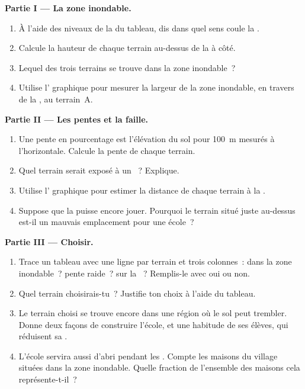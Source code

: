 \begin{problem}
\noindent\textbf{Partie I --- La zone inondable.}\par\nopagebreak
\begin{enumerate}[beginpenalty=10000]
  \item À l'aide des niveaux de la  du tableau, dis dans quel sens
        coule la .
  \item Calcule la hauteur de chaque terrain au-dessus de la  à
        côté.
  \item Lequel des trois terrains se trouve dans la zone inondable~?
  \item Utilise l' graphique pour mesurer la largeur de la zone
        inondable, en travers de la , au terrain~A.
\end{enumerate}

\noindent\textbf{Partie II --- Les pentes et la faille.}\par\nopagebreak
\begin{enumerate}[resume, beginpenalty=10000]
  \item Une pente en pourcentage est l'élévation du sol pour
        \qty{100}{m} mesurés à l'horizontale. Calcule la pente de chaque
        terrain.
  \item Quel terrain serait exposé à un ~? Explique.
  \item Utilise l' graphique pour estimer la distance de chaque
        terrain à la .
  \item Suppose que la  puisse encore jouer. Pourquoi le terrain
        situé juste au-dessus est-il un mauvais emplacement pour une
        école~?
\end{enumerate}

\noindent\textbf{Partie III --- Choisir.}\par\nopagebreak
\begin{enumerate}[resume, beginpenalty=10000]
  \item Trace un tableau avec une ligne par terrain et trois colonnes~:
        dans la zone inondable~? pente raide~? sur la ~? Remplis-le
        avec oui ou non.
  \item Quel terrain choisirais-tu~? Justifie ton choix à l'aide du
        tableau.
  \item Le terrain choisi se trouve encore dans une région où le sol peut
        trembler. Donne deux façons de construire l'école, et une habitude
        de ses élèves, qui réduisent sa .
  \item L'école servira aussi d'abri pendant les . Compte les maisons
        du village situées dans la zone inondable. Quelle fraction de
        l'ensemble des maisons cela représente-t-il~?
\end{enumerate}
\end{problem}
